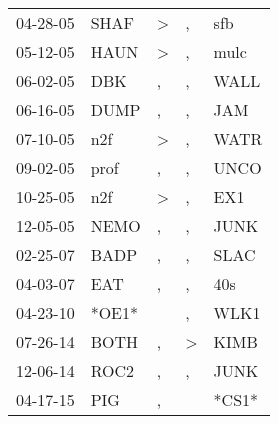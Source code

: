 \begin{supertabular}{lllll}
 04-28-05 &   SHAF &  \textgreater &             , &    sfb \\
 05-12-05 &   HAUN &  \textgreater &             , &   mulc \\
 06-02-05 &    DBK &             , &             , &   WALL \\
 06-16-05 &   DUMP &             , &             , &    JAM \\
 07-10-05 &    n2f &  \textgreater &             , &   WATR \\
 09-02-05 &   prof &             , &             , &   UNCO \\
 10-25-05 &    n2f &  \textgreater &             , &    EX1 \\
 12-05-05 &   NEMO &             , &             , &   JUNK \\
 02-25-07 &   BADP &             , &             , &   SLAC \\
 04-03-07 &    EAT &             , &             , &    40s \\
 04-23-10 &  *OE1* &               &             , &   WLK1 \\
 07-26-14 &   BOTH &             , &  \textgreater &   KIMB \\
 12-06-14 &   ROC2 &             , &             , &   JUNK \\
 04-17-15 &    PIG &             , &               &  *CS1* \\
\end{supertabular}
